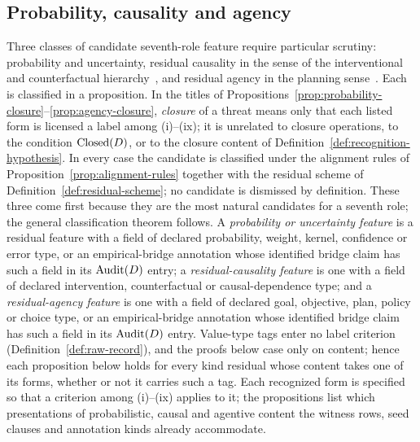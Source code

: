 \subsection{Probability, causality and agency}\label{subsec:threat-closures}

Three classes of candidate seventh-role feature require particular
scrutiny: probability and uncertainty, residual causality in the
sense of the interventional and counterfactual
hierarchy~\citep{Pearl2009}, and residual agency in the planning
sense~\citep{Bratman1987}. Each is classified in a proposition. In the titles of
Propositions~\ref{prop:probability-closure}--\ref{prop:agency-closure},
\emph{closure} of a threat means only that each listed form is licensed a label
among (i)--(ix); it is unrelated to closure operations, to the condition
\(\operatorname{Closed}\!\left(D\right)\), or to the closure content of
Definition~\ref{def:recognition-hypothesis}.
In every case the candidate is classified under the alignment rules
of Proposition~\ref{prop:alignment-rules} together with the residual
scheme of Definition~\ref{def:residual-scheme}; no candidate is
dismissed by definition. These three come first because they are the
most natural candidates for a seventh role; the general classification
theorem follows. A \emph{probability or uncertainty feature} is a residual
feature with a field of declared probability, weight, kernel, confidence or
error type, or an empirical-bridge annotation whose identified bridge claim has
such a field in its \(\operatorname{Audit}\!\left(D\right)\) entry; a \emph{residual-causality feature} is one with a field of declared
intervention, counterfactual or causal-dependence type; and a
\emph{residual-agency feature} is one with a field of declared goal,
objective, plan, policy or choice type, or an empirical-bridge annotation
whose identified bridge claim has such a field in its \(\operatorname{Audit}\!\left(D\right)\) entry.
Value-type tags enter no label criterion (Definition~\ref{def:raw-record}), and
the proofs below case only on content; hence each proposition below holds for
every kind residual whose content takes one of its forms, whether or not it
carries such a tag. Each recognized form is specified so that a criterion
among (i)--(ix) applies to it; the propositions list which presentations of
probabilistic, causal and agentive content the witness rows, seed clauses
and annotation kinds already accommodate.

